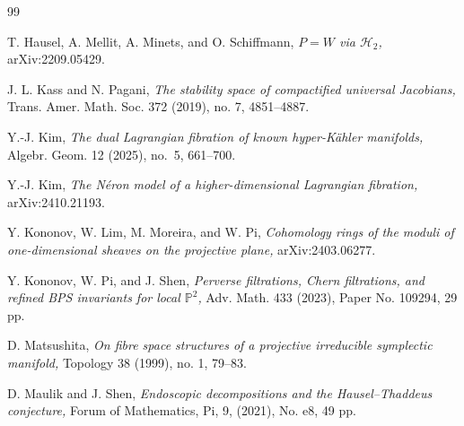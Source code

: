 \documentclass[11pt]{amsart}
\theoremstyle{plain}
\theoremstyle{definition}
\theoremstyle{remark}
\newcommand{\BP}{{\mathbb{P}}}
\begin{document}
\begin{thebibliography}{99}

 T. Hausel, A. Mellit, A. Minets, and O. Schiffmann, {\em $P = W$ via $\mathcal{H}_2$,} arXiv:2209.05429.



 J. L. Kass and N. Pagani, {\em The stability space of compactified universal Jacobians,} Trans. Amer. Math. Soc. 372 (2019), no. 7, 4851--4887.

 Y.-J. Kim, {\em The dual Lagrangian fibration of known hyper-K\"ahler manifolds,} Algebr. Geom. 12 (2025), no.~5, 661--700.

 Y.-J. Kim, {\em The N\'eron model of a higher-dimensional Lagrangian fibration,} arXiv:2410.21193.

 Y. Kononov, W. Lim, M. Moreira, and W. Pi, {\em Cohomology rings of the moduli of one-dimensional sheaves on the projective plane,} arXiv:2403.06277.

 Y. Kononov, W. Pi, and J. Shen, {\em Perverse filtrations, Chern filtrations, and refined {BPS} invariants for local $\BP^2$,} Adv. Math. 433 (2023), Paper No. 109294, 29 pp.



 D. Matsushita, {\em On fibre space structures of a projective irreducible symplectic manifold,} Topology 38 (1999), no. 1, 79--83.


 D. Maulik and J. Shen, {\em Endoscopic decompositions and the Hausel--Thaddeus conjecture,} Forum of Mathematics, Pi, 9, (2021), No. e8, 49 pp.


\end{thebibliography}
\end{document}

